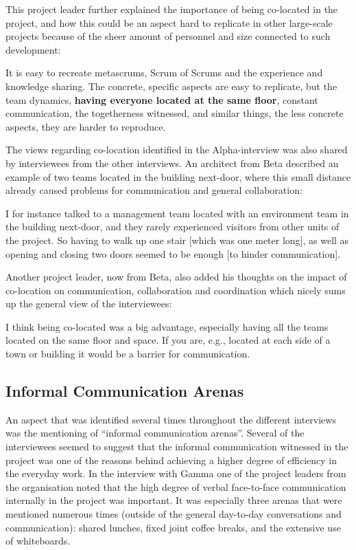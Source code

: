 This project leader further explained the importance of being co-located in the project, and how this could be an aspect hard to replicate in other large-scale projects because of the sheer amount of personnel and size connected to such development:

\begin{fancyquotes}
It is easy to recreate metascrums, Scrum of Scrums and the experience and knowledge sharing. The concrete, specific aspects are easy to replicate, but the team dynamics, \textbf{having everyone located at the same floor}, constant communication, the togetherness witnessed, and similar things, the less concrete aspects, they are harder to reproduce.
\end{fancyquotes}

The views regarding co-location identified in the Alpha-interview was also shared by interviewees from the other interviews. An architect from Beta described an example of two teams located in the building next-door, where this small distance already caused problems for communication and general collaboration:

\begin{fancyquotes}
I for instance talked to a management team located with an environment team in the building next-door, and they rarely experienced visitors from other units of the project. So having to walk up one stair [which was one meter long], as well as opening and closing two doors seemed to be enough [to hinder communication].
\end{fancyquotes}

Another project leader, now from Beta, also added his thoughts on the impact of co-location on communication, collaboration and coordination which nicely sums up the general view of the interviewees:

\begin{fancyquotes}
I think being co-located was a big advantage, especially having all the teams located on the same floor and space. If you are, e.g., located at each side of a town or building it would be a barrier for communication.
\end{fancyquotes}

\subsection{Informal Communication Arenas}

An aspect that was identified several times throughout the different interviews was the mentioning of ``informal communication arenas''. Several of the interviewees seemed to suggest that the informal communication witnessed in the project was one of the reasons behind achieving a higher degree of efficiency in the everyday work. In the interview with Gamma one of the project leaders from the organisation noted that the high degree of verbal face-to-face communication internally in the project was important. It was especially three arenas that were mentioned numerous times (outside of the general day-to-day conversations and communication): shared lunches, fixed joint coffee breaks, and the extensive use of whiteboards.

